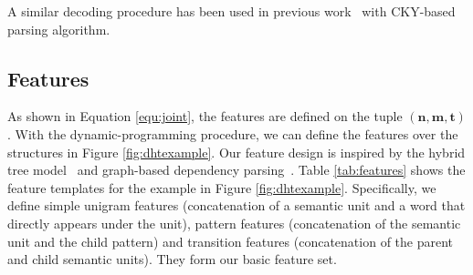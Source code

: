 A similar decoding procedure has been used in previous work~\cite{lu2014semantic,durrett2015neural} with CKY-based parsing algorithm.








\subsection{Features}
\label{sec:features}
As shown in Equation \ref{equ:joint}, the features are defined on the tuple $(\boldsymbol{n}, \boldsymbol{m}, \boldsymbol{t})$. 
With the dynamic-programming procedure, we can define the features over the structures in Figure \ref{fig:dhtexample}. 
Our feature design is inspired by the {hybrid tree} model~\cite{lu2015constrained} and graph-based dependency parsing~\cite{mcdonald2005online}. 
Table \ref{tab:features} shows the feature templates for the example in Figure \ref{fig:dhtexample}. 
Specifically, we define simple unigram features (concatenation of a semantic unit and a word that directly appears under the unit), pattern features (concatenation of the semantic unit and the child pattern) and transition features (concatenation of the parent and child semantic units). 
They form our basic feature set. 


